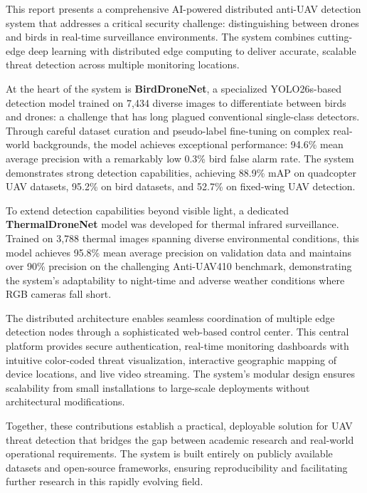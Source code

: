 \documentclass[12pt,a4paper]{report}
\begin{document}
\newpage
\thispagestyle{empty}


\newpage
\thispagestyle{empty}
\begin{center}
\bfseries \abstractname
\end{center}
This report presents a comprehensive AI-powered distributed anti-UAV detection system that addresses a critical security challenge: distinguishing between drones and birds in real-time surveillance environments. The system combines cutting-edge deep learning with distributed edge computing to deliver accurate, scalable threat detection across multiple monitoring locations.

At the heart of the system is \textbf{BirdDroneNet}, a specialized YOLO26s-based detection model trained on 7,434 diverse images to differentiate between birds and drones: a challenge that has long plagued conventional single-class detectors. Through careful dataset curation and pseudo-label fine-tuning on complex real-world backgrounds, the model achieves exceptional performance: 94.6\% mean average precision with a remarkably low 0.3\% bird false alarm rate. The system demonstrates strong detection capabilities, achieving 88.9\% mAP on quadcopter UAV datasets, 95.2\% on bird datasets, and 52.7\% on fixed-wing UAV detection.

To extend detection capabilities beyond visible light, a dedicated \textbf{ThermalDroneNet} model was developed for thermal infrared surveillance. Trained on 3,788 thermal images spanning diverse environmental conditions, this model achieves 95.8\% mean average precision on validation data and maintains over 90\% precision on the challenging Anti-UAV410 benchmark, demonstrating the system's adaptability to night-time and adverse weather conditions where RGB cameras fall short.

The distributed architecture enables seamless coordination of multiple edge detection nodes through a sophisticated web-based control center. This central platform provides secure authentication, real-time monitoring dashboards with intuitive color-coded threat visualization, interactive geographic mapping of device locations, and live video streaming. The system's modular design ensures scalability from small installations to large-scale deployments without architectural modifications.

Together, these contributions establish a practical, deployable solution for UAV threat detection that bridges the gap between academic research and real-world operational requirements. The system is built entirely on publicly available datasets and open-source frameworks, ensuring reproducibility and facilitating further research in this rapidly evolving field.
\end{document}
